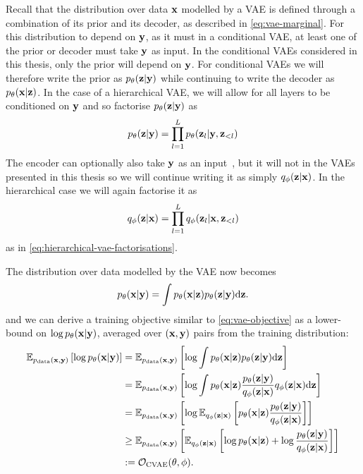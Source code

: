 Recall that the distribution over data ${\mathbf{x}}$ modelled by a VAE is defined through a combination of its prior and its decoder, as described in \cref{eq:vae-marginal}. For this distribution to depend on ${\mathbf{y}}$, as it must in a conditional VAE, at least one of the prior or decoder must take ${\mathbf{y}}$ as input. In the conditional VAEs considered in this thesis, only the prior will depend on ${\mathbf{y}}$. For conditional VAEs we will therefore write the prior as $p_\theta({\mathbf{z}}|{\mathbf{y}})$ while continuing to write the decoder as $p_\theta({\mathbf{x}}|{\mathbf{z}})$. In the case of a hierarchical VAE, we will allow for all layers to be conditioned on ${\mathbf{y}}$ and so factorise $p_\theta({\mathbf{z}}|{\mathbf{y}})$ as
\begin{equation}
    p_\theta({\mathbf{z}}|{\mathbf{y}}) = \prod_{l=1}^L p_\theta({\mathbf{z}}_l|{\mathbf{y}},{\mathbf{z}}_{<l})
\end{equation}
The encoder can optionally also take ${\mathbf{y}}$ as an input~\citep{sohn2015learning}, but it will not in the VAEs presented in this thesis so we will continue writing it as simply $q_\phi({\mathbf{z}}|{\mathbf{x}})$. In the hierarchical case we will again factorise it as
\begin{equation} \label{eq:conditional-hierarchical-vae-factorisations}
    q_\phi({\mathbf{z}}|{\mathbf{x}}) = \prod_{l=1}^L q_\phi({\mathbf{z}}_l|{\mathbf{x}},{\mathbf{z}}_{<l})
\end{equation}
as in \cref{eq:hierarchical-vae-factorisations}.

The distribution over data modelled by the VAE now becomes
\begin{equation} \label{eq:conditional-vae-marginal}
p_\theta({\mathbf{x}}|{\mathbf{y}}) = \int p_\theta({\mathbf{x}}|{\mathbf{z}})p_\theta({\mathbf{z}}|{\mathbf{y}}) \mathrm{d}{\mathbf{z}}.
\end{equation}
and we can derive a training objective similar to \cref{eq:vae-objective} as a lower-bound on $\log p_\theta({\mathbf{x}}|{\mathbf{y}})$, averaged over $({\mathbf{x}}, {\mathbf{y}})$ pairs from the training distribution:
\begin{align}
    \mathbb{E}_{p_{\rm{data}}({\mathbf{x}}, {\mathbf{y}})} \left[ \log p_\theta({\mathbf{x}}|{\mathbf{y}}) \right] &= \mathbb{E}_{p_{\rm{data}}({\mathbf{x}}, {\mathbf{y}})} \left[ \log \int p_\theta({\mathbf{x}}|{\mathbf{z}})p_\theta({\mathbf{z}}|{\mathbf{y}}) \mathrm{d}{\mathbf{z}} \right] \\
    &= \mathbb{E}_{p_{\rm{data}}({\mathbf{x}}, {\mathbf{y}})} \left[ \log \int p_\theta({\mathbf{x}}|{\mathbf{z}})\frac{p_\theta({\mathbf{z}}|{\mathbf{y}})}{q_\phi({\mathbf{z}}|{\mathbf{x}})}q_\phi({\mathbf{z}}|{\mathbf{x}}) \mathrm{d}{\mathbf{z}} \right] \\
    &= \mathbb{E}_{p_{\rm{data}}({\mathbf{x}}, {\mathbf{y}})} \left[ \log \mathbb{E}_{q_\phi({\mathbf{z}}|{\mathbf{x}})} \left[ p_\theta({\mathbf{x}}|{\mathbf{z}})\frac{p_\theta({\mathbf{z}}|{\mathbf{y}})}{q_\phi({\mathbf{z}}|{\mathbf{x}})} \right] \right] \\
    &\geq \mathbb{E}_{p_{\rm{data}}({\mathbf{x}}, {\mathbf{y}})} \left[ \mathbb{E}_{q_\phi({\mathbf{z}}|{\mathbf{x}})} \left[ \log p_\theta({\mathbf{x}}|{\mathbf{z}}) + \log \frac{p_\theta({\mathbf{z}}|{\mathbf{y}})}{q_\phi({\mathbf{z}}|{\mathbf{x}})} \right] \right] \\
    &:= {\mathcal{O}}_\text{CVAE}(\theta, \phi).
\end{align}




